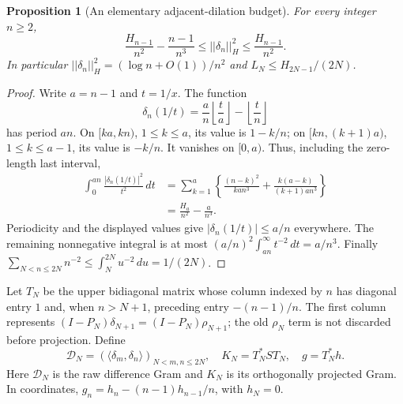 \documentclass[11pt]{article}
\def\norm#1{||#1||}%
\newtheorem{proposition}[theorem]{Proposition}
\theoremstyle{remark}
\newcommand{\norm}[1]{\left\lVert #1\right\rVert}
\begin{document}
\begin{proposition}[An elementary adjacent-dilation budget]
\label{prop:v158-adjacent-budget}
For every integer $n\geq2$,
\begin{equation}
 \frac{H_{n-1}}{n^2}-\frac{n-1}{n^3}
 \leq \norm{\delta_n}_H^2
 \leq\frac{H_{n-1}}{n^2}.
 \label{eq:v158-adjacent-norm}
\end{equation}
In particular $\norm{\delta_n}_H^2=(\log n+O(1))/n^2$ and
$L_N\leq H_{2N-1}/(2N)$.
\end{proposition}
\begin{proof}
Write $a=n-1$ and $t=1/x$. The function
\[
 \delta_n(1/t)=\frac{a}{n}\left\lfloor\frac{t}{a}\right\rfloor
              -\left\lfloor\frac{t}{n}\right\rfloor
\]
has period $an$. On $[ka,kn)$, $1\leq k\leq a$, its value is
$1-k/n$; on $[kn,(k+1)a)$, $1\leq k\leq a-1$, its value is $-k/n$.
It vanishes on $[0,a)$. Thus, including the zero-length last interval,
\begin{align*}
 \int_0^{an}\frac{|\delta_n(1/t)|^2}{t^2}\,dt
 &=\sum_{k=1}^a\left\{
 \frac{(n-k)^2}{k a n^3}
 +\frac{k(a-k)}{(k+1)a n^3}\right\}\\
 &=\frac{H_a}{n^2}-\frac{a}{n^3}.
\end{align*}
Periodicity and the displayed values give $|\delta_n(1/t)|\leq a/n$ everywhere.
The remaining nonnegative integral is at most
$(a/n)^2\int_{an}^{\infty}t^{-2}\,dt=a/n^3$.
Finally $\sum_{N<n\leq2N}n^{-2}\leq\int_N^{2N}u^{-2}\,du=1/(2N)$.
\end{proof}

Let $T_N$ be the upper bidiagonal matrix whose column indexed by $n$
has diagonal entry $1$ and, when $n>N+1$, preceding entry $-(n-1)/n$.
The first column represents $(I-P_N)\delta_{N+1}=(I-P_N)\rho_{N+1}$;
the old $\rho_N$ term is not discarded before projection. Define
\begin{equation}
 \mathcal D_N=(\langle \delta_m,\delta_n\rangle)_{N<m,n\leq2N},\quad
 K_N=T_N^*S T_N,\quad g=T_N^*h.
 \label{eq:v158-difference-gram}
\end{equation}
Here $\mathcal D_N$ is the raw difference Gram and $K_N$ is its
orthogonally projected Gram. In coordinates,
$g_n=h_n-(n-1)h_{n-1}/n$, with $h_N=0$.
\end{document}
